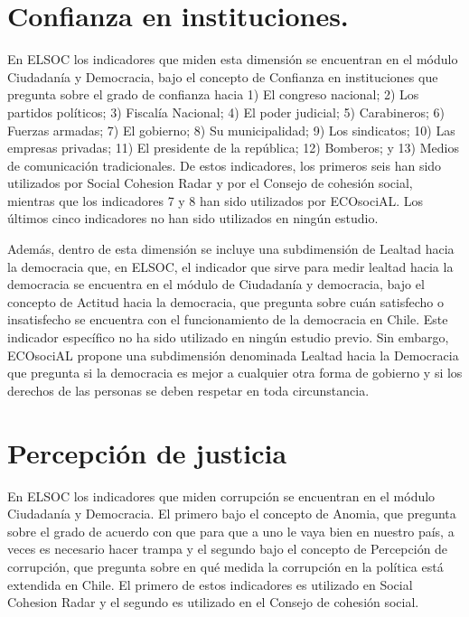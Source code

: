 \documentclass[
  12pt,
]{book}
\begin{document}
\hypertarget{confianza-en-instituciones.}{%
\section{Confianza en instituciones.}\label{confianza-en-instituciones.}}

En ELSOC los indicadores que miden esta dimensión se encuentran en el módulo Ciudadanía y Democracia, bajo el concepto de Confianza en instituciones que pregunta sobre el grado de confianza hacia 1) El congreso nacional; 2) Los partidos políticos; 3) Fiscalía Nacional; 4) El poder judicial; 5) Carabineros; 6) Fuerzas armadas; 7) El gobierno; 8) Su municipalidad; 9) Los sindicatos; 10) Las empresas privadas; 11) El presidente de la república; 12) Bomberos; y 13) Medios de comunicación tradicionales. De estos indicadores, los primeros seis han sido utilizados por Social Cohesion Radar y por el Consejo de cohesión social, mientras que los indicadores 7 y 8 han sido utilizados por ECOsociAL. Los últimos cinco indicadores no han sido utilizados en ningún estudio.

Además, dentro de esta dimensión se incluye una subdimensión de Lealtad hacia la democracia que, en ELSOC, el indicador que sirve para medir lealtad hacia la democracia se encuentra en el módulo de Ciudadanía y democracia, bajo el concepto de Actitud hacia la democracia, que pregunta sobre cuán satisfecho o insatisfecho se encuentra con el funcionamiento de la democracia en Chile. Este indicador específico no ha sido utilizado en ningún estudio previo. Sin embargo, ECOsociAL propone una subdimensión denominada Lealtad hacia la Democracia que pregunta si la democracia es mejor a cualquier otra forma de gobierno y si los derechos de las personas se deben respetar en toda circunstancia.

\hypertarget{percepciuxf3n-de-justicia-1}{%
\section{Percepción de justicia}\label{percepciuxf3n-de-justicia-1}}

En ELSOC los indicadores que miden corrupción se encuentran en el módulo Ciudadanía y Democracia. El primero bajo el concepto de Anomia, que pregunta sobre el grado de acuerdo con que para que a uno le vaya bien en nuestro país, a veces es necesario hacer trampa y el segundo bajo el concepto de Percepción de corrupción, que pregunta sobre en qué medida la corrupción en la política está extendida en Chile. El primero de estos indicadores es utilizado en Social Cohesion Radar y el segundo es utilizado en el Consejo de cohesión social.
\end{document}
